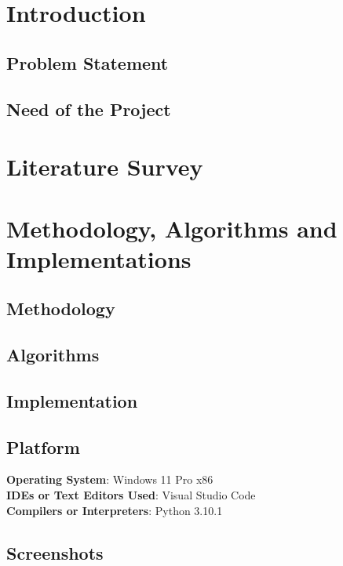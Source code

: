 \documentclass[openany]{report}
\begin{document}
\thispagestyle{empty}
\clearpage

\listoffigures
\clearpage
\listoftables
\clearpage
\setcounter{page}{1}

\chapter{Introduction}

\section{Problem Statement}

\section{Need of the Project}


\chapter{Literature Survey}

\chapter{Methodology, Algorithms and Implementations}

\section{Methodology}

\section{Algorithms}

\section{Implementation}

\section{Platform}
\textbf{Operating System}: Windows 11 Pro x86 \\
\textbf{IDEs or Text Editors Used}: Visual Studio Code\\
\textbf{Compilers or Interpreters}: Python 3.10.1\\

\section{Screenshots}
\end{document}
